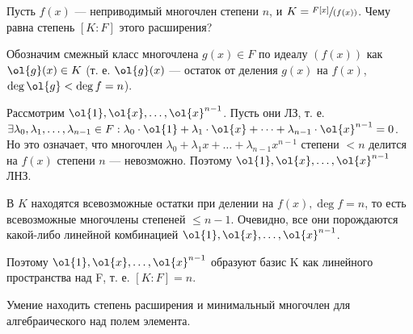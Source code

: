 \begin{problem}
Пусть $f(x)$ --- неприводимый многочлен степени $n$, и $K = \sfrac{F[x]}{(f(x))}$. Чему равна степень $[K : F]$ этого расширения?
\end{problem}

\begin{solution}
Обозначим смежный класс многочлена \(g(x) \in F\) по идеалу $(f(x))$ как \(\ol{g}(x) \in K\) (т. е. $\ol{g}(x)$ --- остаток от деления $g(x)$ на $f(x)$, $\deg \ol{g} < \deg f = n$). 

Рассмотрим \(\ol{1}, \ol{x}, \dots, \ol{x}^{n-1}\). Пусть они ЛЗ, т. е. \(\exists \lambda_0, \lambda_1, \dots, \lambda_{n-1} \in F: \lambda_0\cdot\ol{1}+\lambda_1\cdot\ol{x}+\dots+\lambda_{n-1}\cdot\ol{x}^{n-1} = 0\). Но это означает, что многочлен $\lambda_0+\lambda_1x+\dots+\lambda_{n-1}x^{n-1}$ степени $<n$ делится на $f(x)$ степени $n$ --- невозможно. 
Поэтому \(\ol{1}, \ol{x}, \dots, \ol{x}^{n-1}\) ЛНЗ.

В $K$ находятся всевозможные остатки при делении на $f(x), \deg f = n$, то есть всевозможные многочлены степеней $\le n-1$. Очевидно, все они порождаются какой-либо линейной комбинацией \(\ol{1}, \ol{x}, \dots, \ol{x}^{n-1}\).

Поэтому \(\ol{1}, \ol{x}, \dots, \ol{x}^{n-1}\) образуют базис K как линейного пространства над F, т. е. \([K:F] = n\).
\end{solution}

\begin{problem}[34 (7.9,7.10)] Умение находить степень расширения и минимальный многочлен для алгебраического над полем элемента.
\end{problem}

